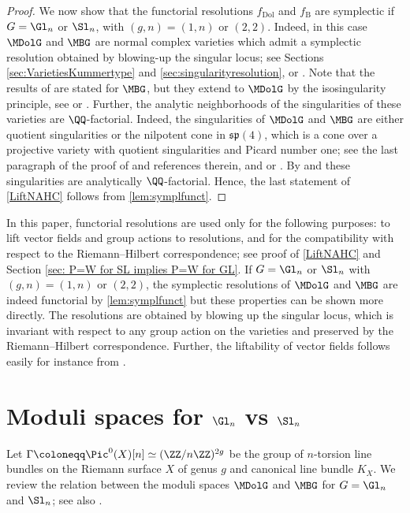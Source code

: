 \begin{proof}
We now show that the functorial resolutions $f_{\mathrm{Dol}}$ and $f_{\mathrm{B}}$ are symplectic if $G=\Gl_n$ or $\Sl_n$, with $(g,n)=(1,n)$ or $(2,2)$. Indeed, in this case $\MDolG$ and $\MBG$ are normal complex varieties which admit a symplectic resolution obtained by blowing-up the singular locus; see Sections \ref{sec:VarietiesKummertype} and \ref{sec:singularityresolution}, or \cite[Th.\,1.8]{BellamySchedler2019}. Note that the results of \cite{BellamySchedler2019} are stated for $\MBG$, but they extend to $\MDolG$ by the isosingularity principle, see \cite[Th.\,10.6]{Simpson1994} or \cite[\S 2.4 and the first paragraph of \S 3.2]{Mauri2021}. Further, the analytic neighborhoods of the singularities of these varieties are $\QQ$-factorial. Indeed, the singularities of $\MDolG$ and $\MBG$ are either quotient singularities or the nilpotent cone in $\mathfrak{sp}(4)$, which is a cone over a projective variety with quotient singularities and Picard number one; see the last paragraph of the proof of \cite[Th.\,1.3]{BellamySchedler2019} and references therein, and \cite[Lem.\,1.3]{MRS18} or \cite[\S 3.4]{Mauri2021}. By \cite[Prop.\,5.15]{KollarMori1998} and \cite[Prop.\,7.4]{K13} these singularities are analytically $\QQ$-factorial. Hence, the last statement of \cref{LiftNAHC} follows from \cref{lem:symplfunct}.
\end{proof}

\begin{rmk}
In this paper, functorial resolutions are used only for the following purposes: to lift vector fields and group actions to resolutions, and for the compatibility with respect to the Riemann--Hilbert correspondence; see proof of \cref{LiftNAHC} and Section \ref{sec: P=W for SL implies P=W for GL}. If $G=\Gl_n$ or $\Sl_n$ with $(g,n)=(1,n)$ or $(2,2)$, the symplectic resolutions of $\MDolG$ and $\MBG$ are indeed functorial by \cref{lem:symplfunct} but these properties can be shown more directly. The resolutions are obtained by blowing up the singular locus, which is invariant with respect to any group action on the varieties and preserved by the Riemann--Hilbert correspondence. Further, the liftability of vector fields follows easily for instance from \cite[Lem.\,5.3]{AV21}.
\end{rmk}

\section{Moduli spaces for \texorpdfstring{$\Gl_n$}{Gln} vs \texorpdfstring{$\Sl_n$}{Sln}}\label{sec:modulispacesforGlSl}
Let $\Gamma \coloneqq \Pic^0(X)[n] \simeq (\ZZ/n\ZZ)^{2g}$ be the group of $n$-torsion line bundles on the Riemann surface $X$ of genus $g$ and canonical line bundle $K_X$. We review the relation between the moduli spaces $\MDolG$ and $\MBG$ for $G=\Gl_n$ and $\Sl_n$; see also \cite{Hitchin1987, Simpson1994, Simpson1994I}.

